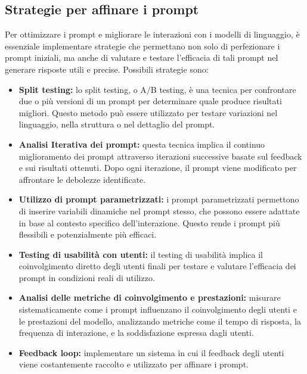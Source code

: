     \subsection{Strategie per affinare i prompt}
    Per ottimizzare i prompt e migliorare le interazioni con i modelli di linguaggio, è essenziale implementare strategie che permettano non solo di perfezionare i prompt iniziali, ma anche di valutare e testare l'efficacia di tali prompt nel generare risposte utili e precise. Possibili strategie sono: 
    \begin{itemize}
        \item \textbf{Split testing:} lo split testing, o A/B testing, è una tecnica per confrontare due o più versioni di un prompt per determinare quale produce risultati migliori. Questo metodo può essere utilizzato per testare variazioni nel linguaggio, nella struttura o nel dettaglio del prompt. 
        
        \item \textbf{Analisi Iterativa dei prompt:} questa tecnica implica il continuo miglioramento dei prompt attraverso iterazioni successive basate sul feedback e sui risultati ottenuti. Dopo ogni iterazione, il prompt viene modificato per affrontare le debolezze identificate. 
        
        \item \textbf{Utilizzo di prompt parametrizzati:} i prompt parametrizzati permettono di inserire variabili dinamiche nel prompt stesso, che possono essere adattate in base al contesto specifico dell'interazione. Questo rende i prompt più flessibili e potenzialmente più efficaci. 
        
        \item \textbf{Testing di usabilità con utenti:} il testing di usabilità implica il coinvolgimento diretto degli utenti finali per testare e valutare l'efficacia dei prompt in condizioni reali di utilizzo. 
        
        \item \textbf{Analisi delle metriche di coinvolgimento e prestazioni:} misurare sistematicamente come i prompt influenzano il coinvolgimento degli utenti e le prestazioni del modello, analizzando metriche come il tempo di risposta, la frequenza di interazione, e la soddisfazione espressa dagli utenti. 
        
        \item \textbf{Feedback loop:} implementare un sistema in cui il feedback degli utenti viene costantemente raccolto e utilizzato per affinare i prompt. 
    \end{itemize}
    
